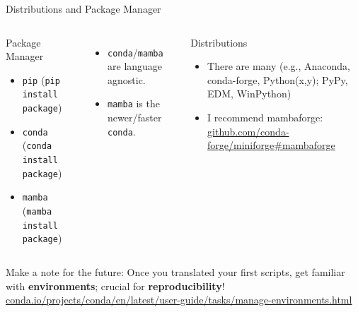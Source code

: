 \documentclass[usepdftitle=false, aspectratio=169]{beamer}
\newcommand{\code}[1]{\texttt{\color{mygreen}#1}}
\begin{document}
\begin{frame}
  {Distributions and Package Manager}

  \begin{columns}
    \begin{block}{Package Manager}
      \begin{itemize}
        \item \code{pip} (\code{pip install package})
        \item \code{conda} (\code{conda install package})
        \item \code{mamba} (\code{mamba install package})
      \end{itemize}
    \end{block}
    \begin{itemize}
      \item \code{conda}/\code{mamba} are language agnostic.
      \item \code{mamba} is the newer/faster \code{conda}.
    \end{itemize}

    \begin{block}{Distributions}
      \begin{itemize}
        \item There are many (e.g., Anaconda, conda-forge, Python(x,y); PyPy,
          EDM, WinPython)
        \item I recommend mambaforge: \href{https://github.com/conda-forge/miniforge\#mambaforge}{github.com/conda-forge/miniforge\#mambaforge}
      \end{itemize}
    \end{block}

  \end{columns}

  \vspace{1cm}

    Make a note for the future: Once you translated your first scripts, get
    familiar with \textbf{environments}; crucial for \textbf{reproducibility}!
    \href{https://conda.io/projects/conda/en/latest/user-guide/tasks/manage-environments.html}{conda.io/projects/conda/en/latest/user-guide/tasks/manage-environments.html}

\end{frame}
\end{document}
